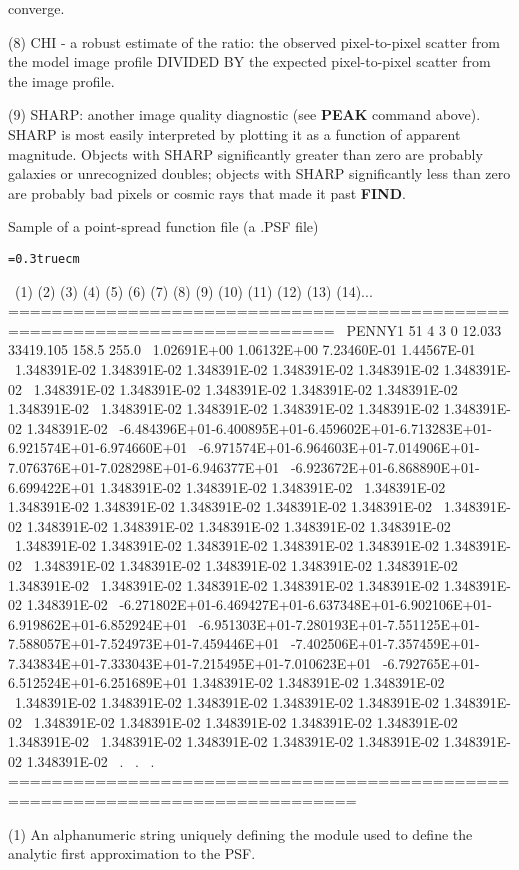 converge.
\item{(8)} CHI - a robust estimate of the ratio:  the observed pixel-to-pixel 
scatter from the model image profile DIVIDED BY the expected 
pixel-to-pixel scatter from the image profile.
\item{(9)} SHARP:  another image quality diagnostic (see {\bf PEAK} 
command above).  
SHARP is most easily interpreted by plotting it as a function of apparent 
magnitude.  Objects with SHARP significantly greater than zero are 
probably galaxies or unrecognized doubles;  objects with SHARP 
significantly less than zero are probably bad pixels or cosmic rays that 
made it past {\bf FIND}.
\vfill
\eject
\centerline{Sample of a point-spread function file (a .PSF file)}
\bigskip
{\noindent\obeylines\obeyspaces\frenchspacing\tt\baselineskip=0.3truecm

\  (1)      (2)   (3)  (4)  (5)   (6)           (7)        (8)      (9)     
       (10)         (11)         (12)          (13)
    (14)...
============================================================================
\ PENNY1     51    4    3    0   12.033      33419.105    158.5    255.0
\   1.02691E+00  1.06132E+00  7.23460E-01  1.44567E-01 
\  1.348391E-02 1.348391E-02 1.348391E-02 1.348391E-02 1.348391E-02 1.348391E-02
\  1.348391E-02 1.348391E-02 1.348391E-02 1.348391E-02 1.348391E-02 1.348391E-02
\  1.348391E-02 1.348391E-02 1.348391E-02 1.348391E-02 1.348391E-02 1.348391E-02
\ -6.484396E+01-6.400895E+01-6.459602E+01-6.713283E+01-6.921574E+01-6.974660E+01
\ -6.971574E+01-6.964603E+01-7.014906E+01-7.076376E+01-7.028298E+01-6.946377E+01
\ -6.923672E+01-6.868890E+01-6.699422E+01 1.348391E-02 1.348391E-02 1.348391E-02
\  1.348391E-02 1.348391E-02 1.348391E-02 1.348391E-02 1.348391E-02 1.348391E-02
\  1.348391E-02 1.348391E-02 1.348391E-02 1.348391E-02 1.348391E-02 1.348391E-02
\  1.348391E-02 1.348391E-02 1.348391E-02 1.348391E-02 1.348391E-02 1.348391E-02
\  1.348391E-02 1.348391E-02 1.348391E-02 1.348391E-02 1.348391E-02 1.348391E-02
\  1.348391E-02 1.348391E-02 1.348391E-02 1.348391E-02 1.348391E-02 1.348391E-02
\ -6.271802E+01-6.469427E+01-6.637348E+01-6.902106E+01-6.919862E+01-6.852924E+01
\ -6.951303E+01-7.280193E+01-7.551125E+01-7.588057E+01-7.524973E+01-7.459446E+01
\ -7.402506E+01-7.357459E+01-7.343834E+01-7.333043E+01-7.215495E+01-7.010623E+01
\ -6.792765E+01-6.512524E+01-6.251689E+01 1.348391E-02 1.348391E-02 1.348391E-02
\  1.348391E-02 1.348391E-02 1.348391E-02 1.348391E-02 1.348391E-02 1.348391E-02
\  1.348391E-02 1.348391E-02 1.348391E-02 1.348391E-02 1.348391E-02 1.348391E-02
\  1.348391E-02 1.348391E-02 1.348391E-02 1.348391E-02 1.348391E-02 1.348391E-02
\                                        .
\                                        .
\                                        .
==============================================================================
}
\item{(1)}  An alphanumeric string uniquely defining the module used to define
the analytic first approximation to the PSF.

